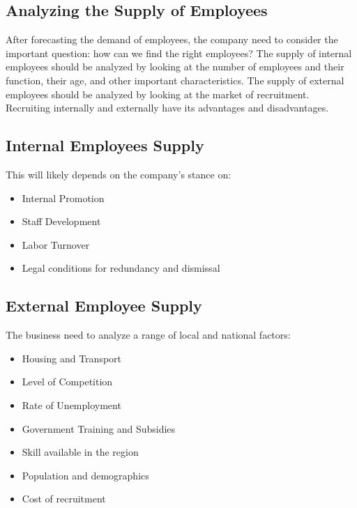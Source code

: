 \documentclass{standalone}
\begin{document}
\subsection{Analyzing the Supply of Employees}
After forecasting the demand of employees, the company need to consider the important question: how can we find the right employees?
The supply of internal employees should be analyzed by looking at the number of employees and their function, their age, and other important characteristics.
The supply of external employees should be analyzed by looking at the market of recruitment.
Recruiting internally and externally have its advantages and disadvantages.

\begin{center}
\end{center}

\subsection{Internal Employees Supply}
This will likely depends on the company's stance on:
\begin{itemize}
	\item Internal Promotion
	\item Staff Development
	\item Labor Turnover
	\item Legal conditions for redundancy and dismissal
\end{itemize}

\subsection{External Employee Supply}
The business need to analyze a range of local and national factors:
\begin{itemize}
	\item Housing and Transport
	\item Level of Competition
	\item Rate of Unemployment
	\item Government Training and Subsidies
	\item Skill available in the region
	\item Population and demographics
	\item Cost of recruitment
\end{itemize}
\end{document}
